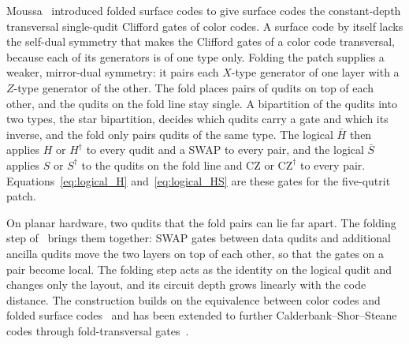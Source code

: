 Moussa~\cite{Moussa2016} introduced folded surface codes to give surface codes the constant-depth transversal single-qudit Clifford gates of color codes. A surface code by itself lacks the self-dual symmetry that makes the Clifford gates of a color code transversal, because each of its generators is of one type only. Folding the patch supplies a weaker, mirror-dual symmetry: it pairs each $X$-type generator of one layer with a $Z$-type generator of the other. The fold places pairs of qudits on top of each other, and the qudits on the fold line stay single. A bipartition of the qudits into two types, the star bipartition, decides which qudits carry a gate and which its inverse, and the fold only pairs qudits of the same type. The logical $\bar H$ then applies $H$ or $H^\dagger$ to every qudit and a SWAP to every pair, and the logical $\bar S$ applies $S$ or $S^\dagger$ to the qudits on the fold line and CZ or $\mathrm{CZ}^\dagger$ to every pair. Equations~\eqref{eq:logical_H} and~\eqref{eq:logical_HS} are these gates for the five-qutrit patch.

On planar hardware, two qudits that the fold pairs can lie far apart. The folding step of~\cite{Moussa2016} brings them together: SWAP gates between data qudits and additional ancilla qudits move the two layers on top of each other, so that the gates on a pair become local. The folding step acts as the identity on the logical qudit and changes only the layout, and its circuit depth grows linearly with the code distance. The construction builds on the equivalence between color codes and folded surface codes~\cite{Kubica2015} and has been extended to further Calderbank--Shor--Steane codes through fold-transversal gates~\cite{BreuckmannBurton2024}.
